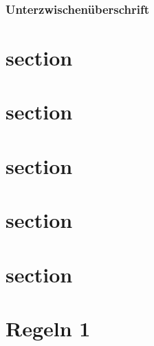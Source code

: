 \documentclass[ngerman]{scrartcl}
\begin{document}
	\lipsum[1-1]

	\subsubsection*{Unterzwischenüberschrift}

	\lipsum[1-1]



	\section{section}
	\lipsum[1-5]

	\section{section}
	\lipsum[1-5]

	\section{section}
	\lipsum[1-5]

	\section{section}
	\lipsum[1-5]

	\section{section}
	\lipsum[1-25]

	\section{Regeln 1}
\end{document}
